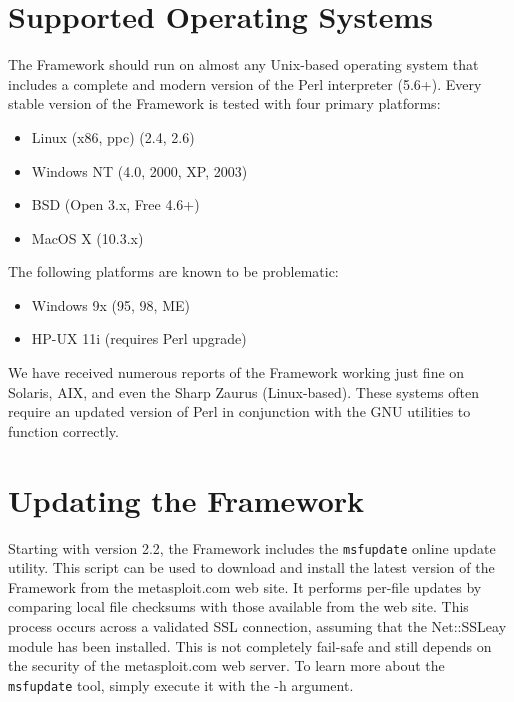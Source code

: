 \documentclass{report}
\begin{document}
    \section{Supported Operating Systems}
    \label{INSTALL-SUPPORT}
\par
The Framework should run on almost any Unix-based operating system that includes
a complete and modern version of the Perl interpreter (5.6+). Every stable
version of the Framework is tested with four primary platforms: 

\begin{itemize}
\item Linux (x86, ppc) (2.4, 2.6)
\item Windows NT (4.0, 2000, XP, 2003)
\item BSD (Open 3.x, Free 4.6+)
\item MacOS X (10.3.x)
\end{itemize}

\par
The following platforms are known to be problematic:
\begin{itemize}
\item Windows 9x (95, 98, ME)
\item HP-UX 11i (requires Perl upgrade)
\end{itemize}

\par
We have received numerous reports of the Framework working just fine on Solaris,
AIX, and even the Sharp Zaurus (Linux-based). These systems often require an
updated version of Perl in conjunction with the GNU utilities to function
correctly.


    \section{Updating the Framework}
    \label{INSTALL-UPDATE}
\par
Starting with version 2.2, the Framework includes the \texttt{msfupdate} online update
utility. This script can be used to download and install the latest version of
the Framework from the metasploit.com web site. It performs per-file updates by
comparing local file checksums with those available from the web site. This
process occurs across a validated SSL connection, assuming that the Net::SSLeay
module has been installed. This is not completely fail-safe and still depends on
the security of the metasploit.com web server. To learn more about the
\texttt{msfupdate} tool, simply execute it with the -h argument. 
\end{document}
